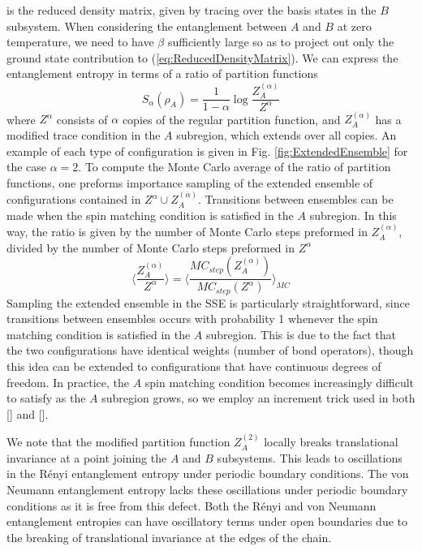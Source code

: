 \documentclass[aps,prb,reprint,floatfix]{revtex4-1}
\begin{document}
is the reduced density matrix, given by tracing over the basis states in the $B$ subsystem.  When considering the entanglement between $A$ and $B$ at zero temperature, we need to have $\beta$ sufficiently large so as to project out only the ground state contribution to (\ref{eq:ReducedDensityMatrix}).  We can express the entanglement entropy in terms of a ratio of partition functions\cite{Humeniuk2012:ExtendedEnsemble}
\begin{equation}
S_{\alpha}(\rho_{A})= \frac{1}{1-\alpha}\log\frac{Z^{(\alpha)}_{A}}{Z^{\alpha}}
\label{eq:RenyiEntropy2}
\end{equation}
where $Z^{\alpha}$ consists of $\alpha$ copies of the regular partition function, and $Z^{(\alpha)}_{A}$ has a modified trace condition in the $A$ subregion, which extends over all copies.  An example of each type of configuration is given in Fig. \ref{fig:ExtendedEnsemble} for the case $\alpha=2$.  To compute the Monte Carlo average of the ratio of partition functions, one preforms importance sampling of the extended ensemble of configurations contained in $Z^{\alpha} \cup Z^{(\alpha)}_{A}$.  Transitions between ensembles can be made when the spin matching condition is satisfied in the $A$ subregion.  In this way, the ratio is given by the number of Monte Carlo steps preformed in $Z^{(\alpha)}_{A}$, divided by the number of Monte Carlo steps preformed in $Z^{\alpha}$
{\allowdisplaybreaks
\begin{equation}
\Bigg\langle\frac{Z^{(\alpha)}_{A}}{Z^{\alpha}}\Bigg\rangle=\Bigg\langle\frac{MC_{step}(Z^{(\alpha)}_{A})}{MC_{step}(Z^{\alpha})}\Bigg\rangle_{MC}	 
\label{eq:RatioAverage}
\end{equation}}Sampling the extended ensemble in the SSE is particularly straightforward, since transitions between ensembles occurs with probability 1 whenever the spin matching condition is satisfied in the $A$ subregion.  This is due to the fact that the two configurations have identical weights (number of bond operators), though this idea can be extended to configurations that have continuous degrees of freedom.\cite{Humeniuk2012:ExtendedEnsemble}  In practice, the $A$ spin matching condition becomes increasingly difficult to satisfy as the $A$ subregion grows, so we employ an increment trick used in both [] and [].  

We note that the modified partition function $Z^{(2)}_{A}$ locally breaks translational invariance at a point joining the $A$ and $B$ subsystems.\cite{Cardy2010:Unusual}  This leads to oscillations in the R\'{e}nyi entanglement entropy under periodic boundary conditions.  The von Neumann entanglement entropy lacks these oscillations under periodic boundary conditions as it is free from this defect.  Both the R\'{e}nyi and von Neumann entanglement entropies can have oscillatory terms under open boundaries due to the breaking of translational invariance at the edges of the chain.
\end{document}
